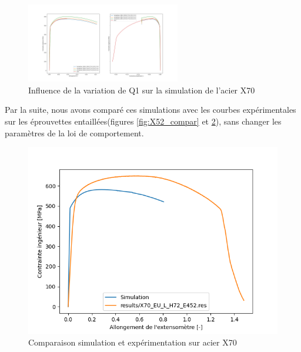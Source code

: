 \documentclass[a4paper, french, 11pt]{article}
\begin{document}
    \begin{figure}[hbt]
        \includegraphics[width=0.6\textwidth]{image/INFLUENCE/X70_Q1_var.png}
        \centering
        \caption{Influence de la variation de Q1 sur la simulation de l'acier X70}
        \label{fig:X70_Q1var}
    \end{figure}

    Par la suite, nous avons comparé ces simulations avec les courbes expérimentales sur les éprouvettes entaillées(figures \ref{fig:X52_compar} et \ref{fig:X70_compar}), sans changer les paramètres de la loi de comportement.

    \begin{figure}[ht]
        \includegraphics{image/INFLUENCE/X70_comparaison.png}
        \centering
        \caption{Comparaison simulation et expérimentation sur acier X70}
        \label{fig:X70_compar}
    \end{figure}
    
\end{document}
